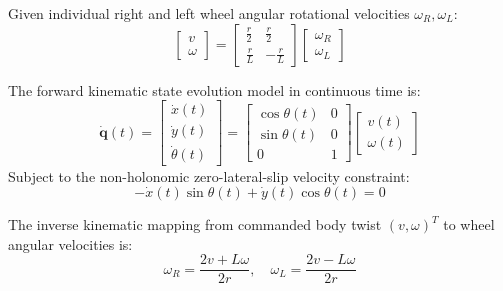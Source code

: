 \documentclass[10pt,a4paper]{article}
\begin{document}
Given individual right and left wheel angular rotational velocities $\omega_R, \omega_L$:
\begin{equation}
\begin{bmatrix} v \\ \omega \end{bmatrix} = \begin{bmatrix} \frac{r}{2} & \frac{r}{2} \\ \frac{r}{L} & -\frac{r}{L} \end{bmatrix} \begin{bmatrix} \omega_R \\ \omega_L \end{bmatrix}
\end{equation}

The forward kinematic state evolution model in continuous time is:
\begin{equation}
\dot{\mathbf{q}}(t) = \begin{bmatrix} \dot{x}(t) \\ \dot{y}(t) \\ \dot{\theta}(t) \end{bmatrix} = \begin{bmatrix} \cos\theta(t) & 0 \\ \sin\theta(t) & 0 \\ 0 & 1 \end{bmatrix} \begin{bmatrix} v(t) \\ \omega(t) \end{bmatrix}
\end{equation}
Subject to the non-holonomic zero-lateral-slip velocity constraint:
\begin{equation}
-\dot{x}(t)\sin\theta(t) + \dot{y}(t)\cos\theta(t) = 0
\end{equation}

The inverse kinematic mapping from commanded body twist $(v, \omega)^T$ to wheel angular velocities is:
\begin{equation}
\omega_R = \frac{2v + L\omega}{2r}, \quad \omega_L = \frac{2v - L\omega}{2r}
\end{equation}
\end{document}

